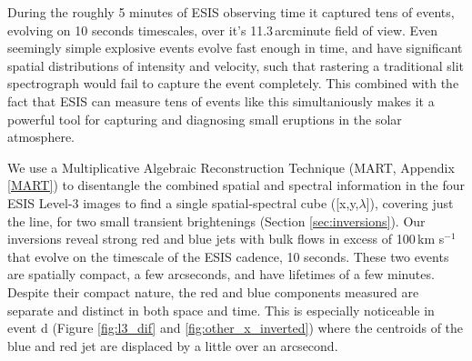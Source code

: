     During the roughly 5 minutes of ESIS observing time it captured tens of events, evolving on 10 seconds timescales, over it's 11.3\,arcminute field of view.
	Even seemingly simple explosive events evolve fast enough in time, and have significant spatial distributions of intensity and velocity, such that rastering a traditional slit spectrograph would fail to capture the event completely. 
	This combined with the fact that ESIS can measure tens of events like this simultaniously makes it a powerful tool for capturing and diagnosing small eruptions in the solar atmosphere.
	
	We use a Multiplicative Algebraic Reconstruction Technique (MART, Appendix \ref{MART}) to disentangle the combined spatial and spectral information in the four ESIS Level-3 images to find a single spatial-spectral cube ([x,y,$\lambda$]), covering just the   line, for two small transient brightenings (Section \ref{sec:inversions}).
	Our inversions reveal strong red and blue jets with bulk flows in excess of 100\,km s$^{-1}$ that evolve on the timescale of the ESIS cadence, 10 seconds.
	These two events are spatially compact, a few arcseconds, and have lifetimes of a few minutes.
	Despite their compact nature, the red and blue components measured are separate and distinct in both space and time. 
	This is especially noticeable in event d (Figure \ref{fig:l3_dif} and \ref{fig:other_x_inverted}) where the centroids of the blue and red jet are displaced by a little over an arcsecond. 
	
